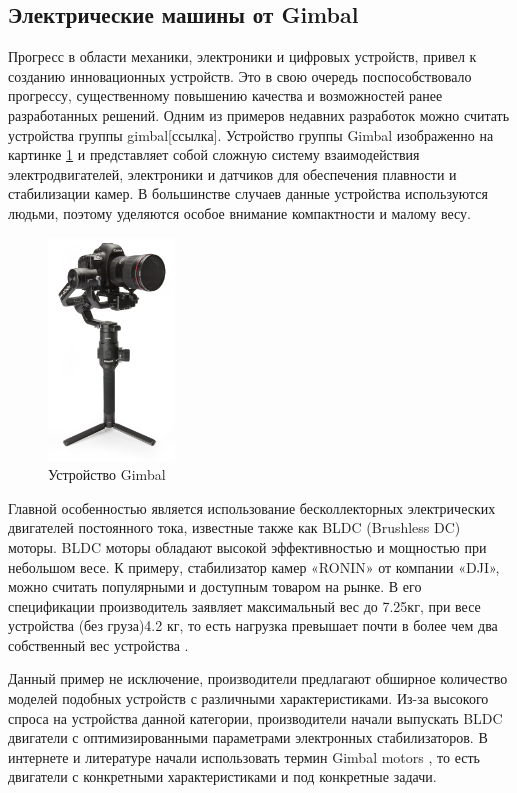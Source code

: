 \subsection{Электрические машины от Gimbal}
Прогресс в области механики, электроники и цифровых устройств, привел к созданию инновационных устройств. Это в свою очередь поспособствовало прогрессу, существенному повышению качества и возможностей ранее разработанных решений. Одним из примеров недавних разработок можно считать устройства группы gimbal[ссылка]. Устройство группы Gimbal изображенно на картинке \ref{gimbal} и представляет собой сложную систему взаимодействия электродвигателей, электроники и датчиков для обеспечения плавности и стабилизации камер. В большинстве случаев данные устройства используются людьми, поэтому уделяются особое внимание компактности и малому весу. 

\begin{figure}[H]
	\centering
	\includegraphics[width=0.3\textwidth]{Src/images/Gimbal.png}
	\caption{Устройство Gimbal}
	\label{gimbal}
\end{figure}

Главной особенностью является использование бесколлекторных электрических двигателей постоянного тока, известные также как BLDC (Brushless DC) моторы. BLDC моторы обладают высокой эффективностью и мощностью при небольшом весе. К примеру, стабилизатор камер «RONIN» от компании «DJI», можно считать популярными и доступным товаром на рынке. В его спецификации производитель заявляет максимальный вес до 7.25кг, при весе устройства (без груза)4.2 кг, то есть нагрузка превышает почти в более чем два собственный вес устройства 
\citep{ronin23}.

Данный пример не исключение, производители предлагают обширное количество моделей подобных устройств с различными характеристиками. Из-за высокого спроса на устройства данной категории, производители начали выпускать BLDC двигатели с оптимизированными параметрами электронных стабилизаторов. В интернете и литературе начали использовать термин Gimbal motors \citep{Lee2018}, то есть двигатели с конкретными характеристиками и под конкретные задачи. 

